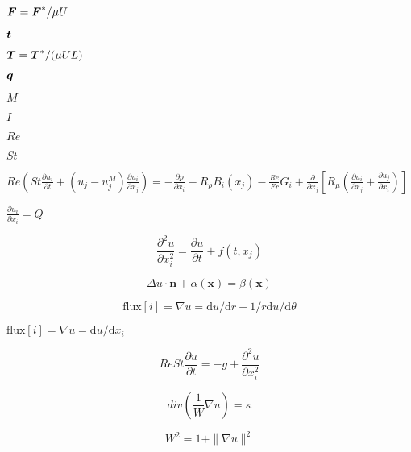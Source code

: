 \documentclass{article}
\begin{document}
$\mbox{\boldmath$F$} = \mbox{\boldmath$F$}^{*}/\mu U$
\pagebreak

$\mbox{\boldmath$t$}$
\pagebreak

$\mbox{\boldmath$T$} = \mbox{\boldmath$T$}^{*}/(\mu UL)$
\pagebreak

$\mbox{\boldmath$q$}$
\pagebreak

$M$
\pagebreak

$I$
\pagebreak

$Re$
\pagebreak

$St$
\pagebreak

$ { Re \left( St \frac{\partial u_i}{\partial t}+ (u_j-u_j^{M}) \frac{\partial u_i}{\partial x_j} \right)= -\frac{\partial p}{\partial x_i} -R_\rho B_i(x_j) - \frac{Re}{Fr} G_i + \frac{\partial }{\partial x_j} \left[ R_\mu \left( \frac{\partial u_i}{\partial x_j}+ \frac{\partial u_j}{\partial x_i} \right) \right] } $
\pagebreak

$ { \frac{\partial u_i}{\partial x_i}=Q } $
\pagebreak

\[ \frac{\partial^2 u}{\partial x_i^2}=\frac{\partial u}{\partial t}+f(t,x_j) \]
\pagebreak

\[ \Delta u \cdot \mathbf{n} + \alpha (\mathbf{x}) = \beta (\mathbf{x}) \]
\pagebreak

\[ \mbox{flux}[i] = \nabla u = \mbox{d}u / \mbox{d} r + 1/r \mbox{d}u / \mbox{d} \theta \]
\pagebreak

$ \mbox{flux}[i] = \nabla u = \mbox{d}u / \mbox{d}x_i $
\pagebreak

\[ Re St \frac{\partial u}{\partial t} = - g + \frac{\partial^2 u}{\partial x_i^2} \]
\pagebreak

\[ div (\frac{1}{W} \nabla u) = \kappa \]
\pagebreak

\[ W^2=1+\|\nabla u\|^2 \]
\pagebreak
\end{document}
